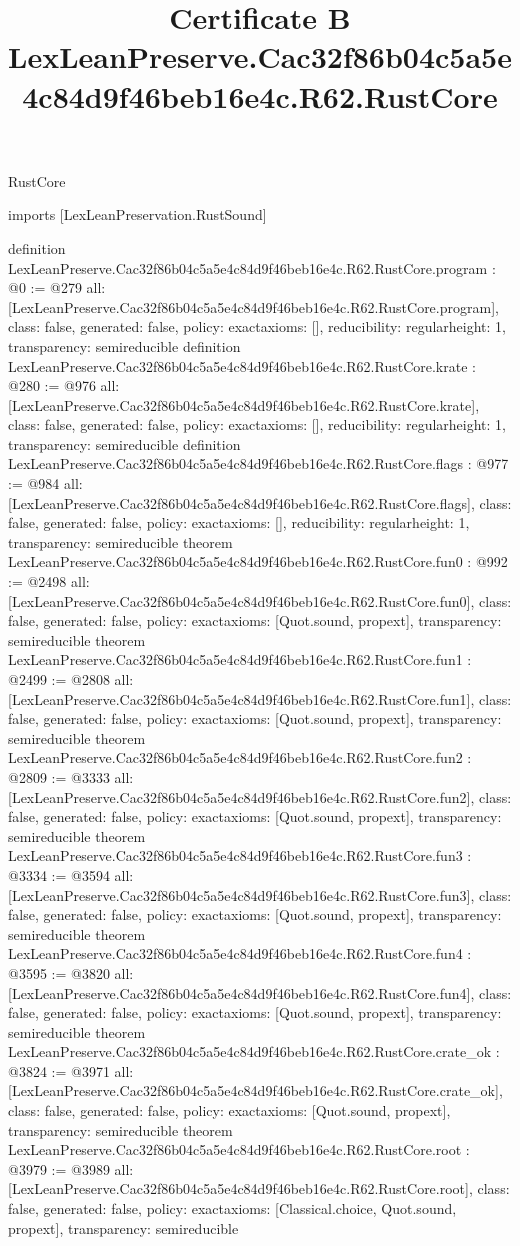 \begin{lexlean}{RustCore}
\title{Certificate B LexLeanPreserve.Cac32f86b04c5a5e4c84d9f46beb16e4c.R62.RustCore}
\begin{coremodule}
imports [LexLeanPreservation.RustSound]

definition LexLeanPreserve.Cac32f86b04c5a5e4c84d9f46beb16e4c.R62.RustCore.program : @0 := @279 {
  all: [LexLeanPreserve.Cac32f86b04c5a5e4c84d9f46beb16e4c.R62.RustCore.program],
  class: false,
  generated: false,
  policy: exact{axioms: []},
  reducibility: regular{height: 1},
  transparency: semireducible
}
definition LexLeanPreserve.Cac32f86b04c5a5e4c84d9f46beb16e4c.R62.RustCore.krate : @280 := @976 {
  all: [LexLeanPreserve.Cac32f86b04c5a5e4c84d9f46beb16e4c.R62.RustCore.krate],
  class: false,
  generated: false,
  policy: exact{axioms: []},
  reducibility: regular{height: 1},
  transparency: semireducible
}
definition LexLeanPreserve.Cac32f86b04c5a5e4c84d9f46beb16e4c.R62.RustCore.flags : @977 := @984 {
  all: [LexLeanPreserve.Cac32f86b04c5a5e4c84d9f46beb16e4c.R62.RustCore.flags],
  class: false,
  generated: false,
  policy: exact{axioms: []},
  reducibility: regular{height: 1},
  transparency: semireducible
}
theorem LexLeanPreserve.Cac32f86b04c5a5e4c84d9f46beb16e4c.R62.RustCore.fun0 : @992 := @2498 {
  all: [LexLeanPreserve.Cac32f86b04c5a5e4c84d9f46beb16e4c.R62.RustCore.fun0],
  class: false,
  generated: false,
  policy: exact{axioms: [Quot.sound, propext]},
  transparency: semireducible
}
theorem LexLeanPreserve.Cac32f86b04c5a5e4c84d9f46beb16e4c.R62.RustCore.fun1 : @2499 := @2808 {
  all: [LexLeanPreserve.Cac32f86b04c5a5e4c84d9f46beb16e4c.R62.RustCore.fun1],
  class: false,
  generated: false,
  policy: exact{axioms: [Quot.sound, propext]},
  transparency: semireducible
}
theorem LexLeanPreserve.Cac32f86b04c5a5e4c84d9f46beb16e4c.R62.RustCore.fun2 : @2809 := @3333 {
  all: [LexLeanPreserve.Cac32f86b04c5a5e4c84d9f46beb16e4c.R62.RustCore.fun2],
  class: false,
  generated: false,
  policy: exact{axioms: [Quot.sound, propext]},
  transparency: semireducible
}
theorem LexLeanPreserve.Cac32f86b04c5a5e4c84d9f46beb16e4c.R62.RustCore.fun3 : @3334 := @3594 {
  all: [LexLeanPreserve.Cac32f86b04c5a5e4c84d9f46beb16e4c.R62.RustCore.fun3],
  class: false,
  generated: false,
  policy: exact{axioms: [Quot.sound, propext]},
  transparency: semireducible
}
theorem LexLeanPreserve.Cac32f86b04c5a5e4c84d9f46beb16e4c.R62.RustCore.fun4 : @3595 := @3820 {
  all: [LexLeanPreserve.Cac32f86b04c5a5e4c84d9f46beb16e4c.R62.RustCore.fun4],
  class: false,
  generated: false,
  policy: exact{axioms: [Quot.sound, propext]},
  transparency: semireducible
}
theorem LexLeanPreserve.Cac32f86b04c5a5e4c84d9f46beb16e4c.R62.RustCore.crate_ok : @3824 := @3971 {
  all: [LexLeanPreserve.Cac32f86b04c5a5e4c84d9f46beb16e4c.R62.RustCore.crate_ok],
  class: false,
  generated: false,
  policy: exact{axioms: [Quot.sound, propext]},
  transparency: semireducible
}
theorem LexLeanPreserve.Cac32f86b04c5a5e4c84d9f46beb16e4c.R62.RustCore.root : @3979 := @3989 {
  all: [LexLeanPreserve.Cac32f86b04c5a5e4c84d9f46beb16e4c.R62.RustCore.root],
  class: false,
  generated: false,
  policy: exact{axioms: [Classical.choice, Quot.sound, propext]},
  transparency: semireducible
}


\end{coremodule}
\end{lexlean}
